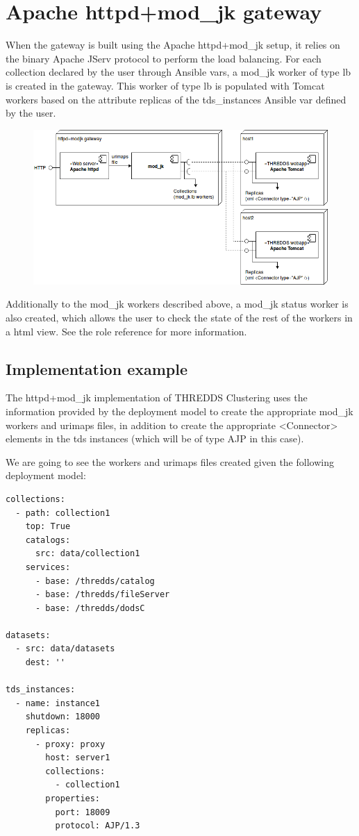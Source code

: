 \documentclass[a4paper,12pt]{article}
\begin{document}
\section{Apache httpd+mod\_jk gateway}

When the gateway is built using the Apache httpd+mod\_jk setup, it relies on the binary Apache JServ protocol to perform the load balancing. For each collection declared by the user through Ansible vars, a mod\_jk worker of type lb is created in the gateway. This worker of type lb is populated with Tomcat workers based on the attribute replicas of the tds\_instances Ansible var defined by the user.

\begin{figure}[h]
\includegraphics[width=1\textwidth]{images/jk-gateway.png}
\end{figure}

Additionally to the mod\_jk workers described above, a mod\_jk status worker is also created, which allows the user to check the state of the rest of the workers in a html view. See the role reference for more information.

\subsection{Implementation example}

The httpd+mod\_jk implementation of THREDDS Clustering uses the information provided by the deployment model to create the appropriate mod\_jk workers and urimaps files, in addition to create the appropriate <Connector> elements in the tds instances (which will be of type AJP in this case).

We are going to see the workers and urimaps files created given the following deployment model:

\begin{lstlisting}
collections:
  - path: collection1 
    top: True 
    catalogs:
      src: data/collection1
    services: 
      - base: /thredds/catalog
      - base: /thredds/fileServer
      - base: /thredds/dodsC

datasets:
  - src: data/datasets
    dest: '' 

tds_instances:
  - name: instance1
    shutdown: 18000
    replicas: 
      - proxy: proxy 
        host: server1
        collections: 
          - collection1
        properties: 
          port: 18009
          protocol: AJP/1.3
\end{lstlisting}
\end{document}
